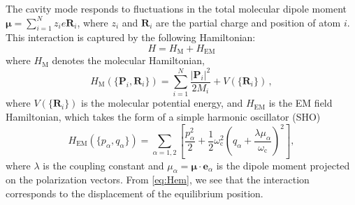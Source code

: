 \documentclass[%
 reprint,
 amsmath,amssymb,
 aps,
]{revtex4-2}
\begin{document}
The cavity mode responds to fluctuations in the total molecular dipole moment $\bm{\mu} = \sum_{i=1}^N z_i e \bm{R}_i$, where $z_i$ and $\bm{R}_i$ are the partial charge and position of atom $i$. 
This interaction is captured by the following Hamiltonian:
\begin{equation}
H = H_\mathrm{M}+H_\mathrm{EM}
\end{equation}
where $H_\mathrm{M}$ denotes the molecular Hamiltonian, %
\begin{equation}
H_\mathrm{M}(\{ \bm P_i,\bm R_i \}) = \sum_{i=1}^{N} \frac{|\bm P_i|^2}{2 M_i} +V(\{ \bm R_i\}) \,,
\end{equation}
where $V(\{ \bm R_i \})$ is the molecular potential energy, and $H_\mathrm{EM}$ is the EM field Hamiltonian, which takes the form of a simple harmonic oscillator (SHO)
\begin{equation}
H_\mathrm{EM} (\{ p_\alpha, q_\alpha \}) = \sum_{\alpha=1,2} \left[ \frac{p_\alpha^2}{2}+\frac{1}{2} \omega_\mathrm{c}^2\left(q_\alpha +\frac{ \lambda \mu_\alpha}{\omega_\mathrm{c}} \right)^2 \right], \label{eq:Hem}
\end{equation}
where $\lambda$ is the coupling constant and $\mu_\alpha = \bm \mu \cdot \bm e_\alpha$ is the dipole moment projected on the polarization vectors.
From \cref{eq:Hem}, we see that the interaction corresponds to the displacement of the equilibrium position. %
\end{document}
